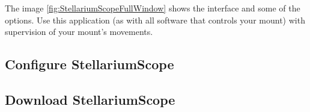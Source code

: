The image \ref{fig:StellariumScopeFullWindow} shows the interface and some of the options.  Use this application (as with all software that controls your mount) with supervision of your mount's movements.

\subsection{Configure StellariumScope}
\label{sec:plugins:StellariumScope:configure}

\subsection{Download StellariumScope}